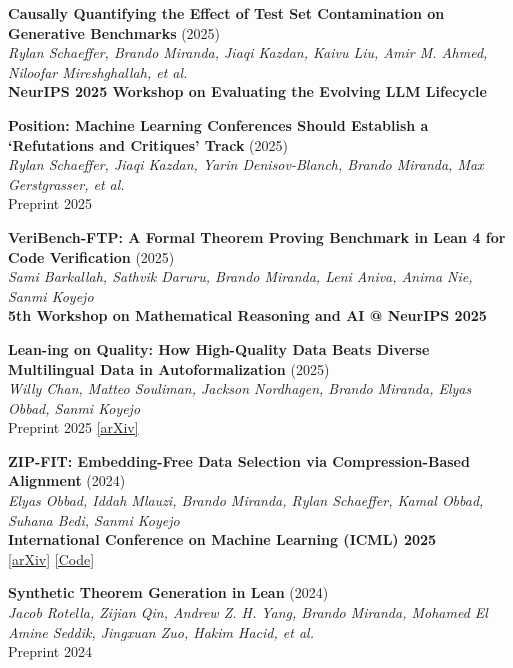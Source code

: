 \documentclass{article}
\newenvironment{changemargin}[2]{%
  \begin{list}{}{%
    \setlength{\topsep}{0pt}%
    \setlength{\leftmargin}{#1}%
    \setlength{\rightmargin}{#2}%
    \setlength{\listparindent}{\parindent}%
    \setlength{\itemindent}{\parindent}%
    \setlength{\parsep}{\parskip}%
  }%
  \item[]}{\end{list}
}
\newenvironment{body} {
	\vspace*{-16pt}
	\begin{changemargin}{-0.25in}{-0.5in}
  }	
	{\end{changemargin}
}
\begin{document}
\begin{body}
    \vspace{10pt}
    \textbf{Causally Quantifying the Effect of Test Set Contamination on Generative Benchmarks} (2025)\\
    \emph{Rylan Schaeffer, Brando Miranda, Jiaqi Kazdan, Kaivu Liu, Amir M. Ahmed, Niloofar Mireshghallah, et al.}\\
    \textbf{NeurIPS 2025 Workshop on Evaluating the Evolving LLM Lifecycle}

    \vspace{10pt}
    \textbf{Position: Machine Learning Conferences Should Establish a `Refutations and Critiques' Track} (2025)\\
    \emph{Rylan Schaeffer, Jiaqi Kazdan, Yarin Denisov-Blanch, Brando Miranda, Max Gerstgrasser, et al.}\\
    Preprint 2025

    \vspace{10pt}
    \textbf{VeriBench-FTP: A Formal Theorem Proving Benchmark in Lean 4 for Code Verification} (2025)\\
    \emph{Sami Barkallah, Sathvik Daruru, Brando Miranda, Leni Aniva, Anima Nie, Sanmi Koyejo}\\
    \textbf{5th Workshop on Mathematical Reasoning and AI @ NeurIPS 2025}

    \vspace{10pt}
    \textbf{Lean-ing on Quality: How High-Quality Data Beats Diverse Multilingual Data in Autoformalization} (2025)\\
    \emph{Willy Chan, Matteo Souliman, Jackson Nordhagen, Brando Miranda, Elyas Obbad, Sanmi Koyejo}\\
    Preprint 2025 \href{https://arxiv.org/abs/2502.15795}{[arXiv]}

    \vspace{10pt}
    \textbf{ZIP-FIT: Embedding-Free Data Selection via Compression-Based Alignment} (2024)\\
    \emph{Elyas Obbad, Iddah Mlauzi, Brando Miranda, Rylan Schaeffer, Kamal Obbad, Suhana Bedi, Sanmi Koyejo}\\
    \textbf{International Conference on Machine Learning (ICML) 2025}\\
    \href{https://arxiv.org/abs/2410.18194}{[arXiv]} \href{https://github.com/stair-lab/ZIP-FIT}{[Code]}

    \vspace{10pt}
    \textbf{Synthetic Theorem Generation in Lean} (2024)\\
    \emph{Jacob Rotella, Zijian Qin, Andrew Z. H. Yang, Brando Miranda, Mohamed El Amine Seddik, Jingxuan Zuo, Hakim Hacid, et al.}\\
    Preprint 2024


\end{body}
\end{document}
